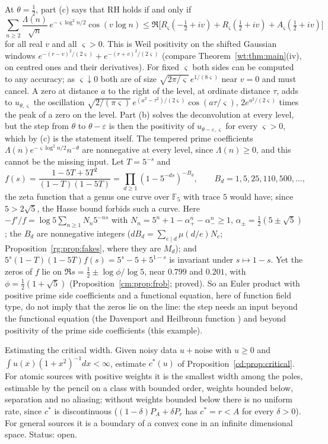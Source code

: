 At $\theta=\frac12$, part (c) says that RH holds if and only if
\[
\sum_{n\ge2}\frac{\Lambda(n)}{\sqrt n}\,e^{-\varsigma\log^2n/2}\cos(v\log n)\le\Re\bigl[R_\varsigma(-\tfrac12+iv)+R_\varsigma(\tfrac12+iv)+A_\varsigma(\tfrac12+iv)\bigr]
\]
for all real $v$ and all $\varsigma>0$. This is Weil positivity on the shifted Gaussian windows $e^{-(r-v)^2/(2\varsigma)}+e^{-(r+v)^2/(2\varsigma)}$ (compare Theorem~\ref{wt:thm:main}(iv), on centred ones and their derivatives). For fixed $\varsigma$ both sides can be computed to any accuracy; as $\varsigma\downarrow0$ both are of size $\sqrt{2\pi/\varsigma}\,e^{1/(8\varsigma)}$ near $v=0$ and must cancel. A zero at distance $a$ to the right of the level, at ordinate distance $\tau$, adds to $u_{\theta,\varsigma}$ the oscillation $\sqrt{2/(\pi\varsigma)}\,e^{(a^2-\tau^2)/(2\varsigma)}\cos(a\tau/\varsigma)$, $2e^{a^2/(2\varsigma)}$ times the peak of a zero on the level. Part (b) solves the deconvolution at every level, but the step from $\theta$ to $\theta-\varepsilon$ is then the positivity of $u_{\theta-\varepsilon,\varsigma}$ for every $\varsigma>0$, which by (c) is the statement itself. The tempered prime coefficients $\Lambda(n)e^{-\varsigma\log^2n/2}n^{-\theta}$ are nonnegative at every level, since $\Lambda(n)\ge0$, and this cannot be the missing input. Let $T=5^{-s}$ and
\[
f(s)=\frac{1-5T+5T^2}{(1-T)(1-5T)}=\prod_{d\ge1}(1-5^{-ds})^{-B_d},\qquad B_d=1,5,25,110,500,\dots,
\]
the zeta function that a genus one curve over $\mathbb F_5$ with trace $5$ would have; since $5>2\sqrt5$, the Hasse bound forbids such a curve. Here $-f'/f=\log5\sum_{n\ge1}N_n5^{-ns}$ with $N_n=5^n+1-\alpha_+^n-\alpha_-^n\ge1$, $\alpha_\pm=\frac12(5\pm\sqrt5)$; the $B_d$ are nonnegative integers ($dB_d=\sum_{e\mid d}\mu(d/e)N_e$; Proposition~\ref{rg:prop:fakes}, where they are $M_d$); and $5^s(1-T)(1-5T)f(s)=5^s-5+5^{1-s}$ is invariant under $s\mapsto1-s$. Yet the zeros of $f$ lie on $\Re s=\frac12\pm\log\phi/\log5$, near $0.799$ and $0.201$, with $\phi=\frac12(1+\sqrt5)$ (Proposition~\ref{cm:prop:frob}; proved). So an Euler product with positive prime side coefficients and a functional equation, here of function field type, do not imply that the zeros lie on the line: the step needs an input beyond the functional equation (the Davenport and Heilbronn function \cite{DH36}) and beyond positivity of the prime side coefficients (this example).

\begin{problem}\label{cd:prob:width}
Estimating the critical width. Given noisy data $u+\text{noise}$ with $u\ge0$ and $\int u(x)(1+x^2)^{-1}dx<\infty$, estimate $c^*(u)$ of Proposition~\ref{cd:prop:critical}. For atomic sources with positive weights it is the smallest width among the poles, estimable by the pencil on a class with bounded order, weights bounded below, separation and no aliasing; without weights bounded below there is no uniform rate, since $c^*$ is discontinuous ($(1-\delta)P_A+\delta P_r$ has $c^*=r<A$ for every $\delta>0$). For general sources it is a boundary of a convex cone in an infinite dimensional space. Status: open.
\end{problem}

